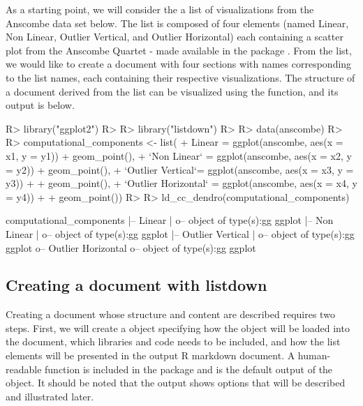 \documentclass[
]{jss}
\begin{document}
As a starting point, we will consider the a list of visualizations from
the Anscombe data set below. The list is composed of four 
\citep{wickham2016} elements (named Linear, Non Linear, Outlier
Vertical, and Outlier Horizontal) each containing a scatter plot from
the Anscombe Quartet - made available in the  package
\citep{R}. From the  list, we would like
to create a document with four sections with names corresponding to the
list names, each containing their respective visualizations. The
structure of a document derived from the 
list can be visualized using the  function, and its
output is below.

\begin{CodeChunk}
\begin{CodeInput}
R> library("ggplot2")
R> 
R> library("listdown")
R> 
R> data(anscombe)
R> 
R> computational_components <- list(
+   Linear = ggplot(anscombe, aes(x = x1, y = y1)) + geom_point(),
+   `Non Linear` = ggplot(anscombe, aes(x = x2, y = y2)) + geom_point(),
+   `Outlier Vertical`= ggplot(anscombe, aes(x = x3, y = y3)) + 
+     geom_point(),
+   `Outlier Horizontal` =  ggplot(anscombe, aes(x = x4, y = y4)) + 
+     geom_point())
R> 
R> ld_cc_dendro(computational_components)
\end{CodeInput}
\begin{CodeOutput}

computational_components
  |-- Linear
  |  o-- object of type(s):gg ggplot
  |-- Non Linear
  |  o-- object of type(s):gg ggplot
  |-- Outlier Vertical
  |  o-- object of type(s):gg ggplot
  o-- Outlier Horizontal
     o-- object of type(s):gg ggplot
\end{CodeOutput}
\end{CodeChunk}

\hypertarget{creating-a-document-with-listdown}{%
\subsection{Creating a document with
listdown}\label{creating-a-document-with-listdown}}

Creating a document whose structure and content are described
 requires two steps. First, we will
create a  object specifying how the \newline
{} object will be loaded into the document,
which libraries and code needs to be included, and how the list elements
will be presented in the output R markdown document. A human-readable
 function is included in the package and is the default
output of the object. It should be noted that the output shows options
that will be described and illustrated later.
\end{document}
